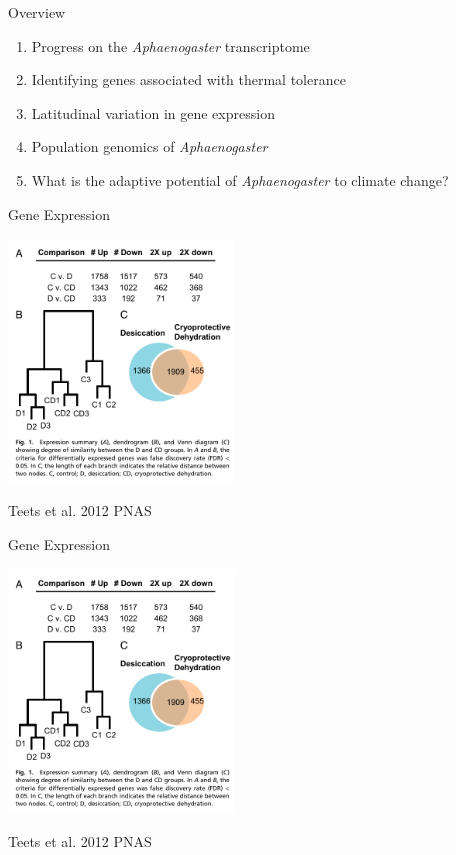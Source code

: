 \documentclass{beamer}
\begin{document}
\begin{frame}{Overview}
	\begin{enumerate}
  		\item Progress on the \textit{Aphaenogaster} transcriptome
	  	\item<1-| alert@1> Identifying genes associated with thermal tolerance
		\item Latitudinal variation in gene expression
  		\item Population genomics of \textit{Aphaenogaster}
  		\item What is the adaptive potential of \textit{Aphaenogaster} to climate change?
	\end{enumerate}
\end{frame}


\begin{frame}{Gene Expression}
	\begin{center}
		\includegraphics[width=6cm]{Teets2012_Fig1_genex.png}
	\end{center}

	\tiny{Teets et al. 2012 PNAS }
\end{frame}


\begin{frame}{Gene Expression}
	\begin{center}
		\includegraphics[width=6cm]{Teets2012_Fig1_genex.png}
	\end{center}

	\tiny{Teets et al. 2012 PNAS }
\end{frame}
\end{document}
